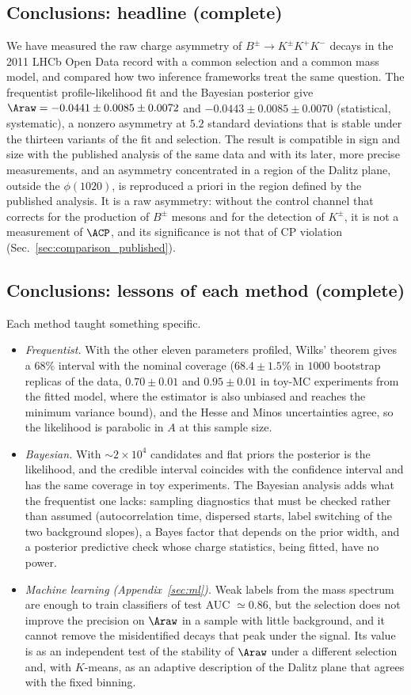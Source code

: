 \subsection{Conclusions: headline (complete)}
We have measured the raw charge asymmetry of $B^\pm\to K^\pm K^+K^-$ decays in the 2011 LHCb Open Data record with a common selection and a common mass model, and compared how two inference frameworks treat the same question. The frequentist profile-likelihood fit and the Bayesian posterior give $\Araw=-0.0441\pm0.0085\pm0.0072$ and $-0.0443\pm0.0085\pm0.0070$ (statistical, systematic), a nonzero asymmetry at $5.2$ standard deviations that is stable under the thirteen variants of the fit and selection. The result is compatible in sign and size with the published analysis of the same data and with its later, more precise measurements, and an asymmetry concentrated in a region of the Dalitz plane, outside the $\phi(1020)$, is reproduced a priori in the region defined by the published analysis. It is a raw asymmetry: without the control channel that corrects for the production of $B^\pm$ mesons and for the detection of $K^\pm$, it is not a measurement of $\ACP$, and its significance is not that of CP violation (Sec.~\ref{sec:comparison_published}).

\subsection{Conclusions: lessons of each method (complete)}
Each method taught something specific.
\begin{itemize}[leftmargin=*,itemsep=2pt]
\item \emph{Frequentist.} With the other eleven parameters profiled, Wilks' theorem gives a $68\%$ interval with the nominal coverage ($68.4\pm1.5\%$ in $1000$ bootstrap replicas of the data, $0.70\pm0.01$ and $0.95\pm0.01$ in toy-MC experiments from the fitted model, where the estimator is also unbiased and reaches the minimum variance bound), and the Hesse and Minos uncertainties agree, so the likelihood is parabolic in $A$ at this sample size.
\item \emph{Bayesian.} With $\sim2\times10^4$ candidates and flat priors the posterior is the likelihood, and the credible interval coincides with the confidence interval and has the same coverage in toy experiments. The Bayesian analysis adds what the frequentist one lacks: sampling diagnostics that must be checked rather than assumed (autocorrelation time, dispersed starts, label switching of the two background slopes), a Bayes factor that depends on the prior width, and a posterior predictive check whose charge statistics, being fitted, have no power.
\item \emph{Machine learning (Appendix~\ref{sec:ml}).} Weak labels from the mass spectrum are enough to train classifiers of test AUC $\simeq0.86$, but the selection does not improve the precision on $\Araw$ in a sample with little background, and it cannot remove the misidentified decays that peak under the signal. Its value is as an independent test of the stability of $\Araw$ under a different selection and, with $K$-means, as an adaptive description of the Dalitz plane that agrees with the fixed binning.
\end{itemize}

